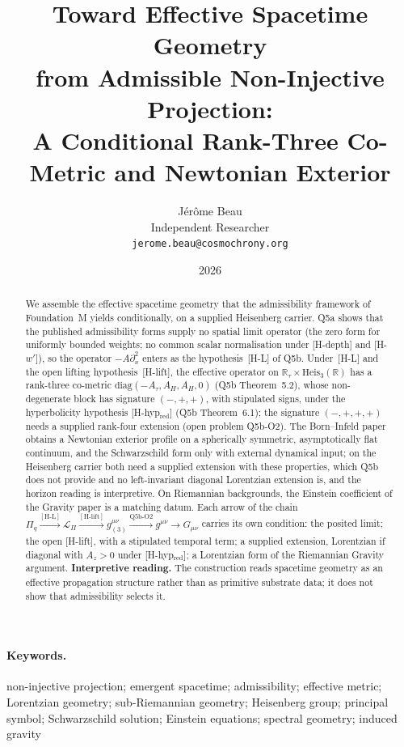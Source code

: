 \documentclass[11pt,a4paper]{article}
\title{Toward Effective Spacetime Geometry\\
from Admissible Non-Injective Projection:\\
A Conditional Rank-Three Co-Metric and Newtonian Exterior}
\author{J\'er\^ome Beau\\
\small Independent Researcher\\
\small \texttt{jerome.beau@cosmochrony.org}}
\date{2026}
\begin{document}
  \maketitle

  \begingroup
  \setlength{\emergencystretch}{2em}
  \begin{abstract}
    We assemble the effective spacetime geometry that the admissibility framework of Foundation~M yields
    conditionally, on a supplied Heisenberg carrier.
    Q5a shows that the published admissibility forms supply no spatial limit operator (the zero form for uniformly
    bounded weights; no common scalar normalisation under [H-depth] and [H-$w'$]), so the operator
    $-A\partial_x^2$ enters as the hypothesis~[H-L] of Q5b.
    Under~[H-L] and the open lifting hypothesis~[H-lift], the effective operator on
    $\mathbb{R}_\tau \times \mathrm{Heis}_3(\mathbb{R})$ has a rank-three co-metric
    $\mathrm{diag}(-A_\tau, A_H, A_H, 0)$ (Q5b Theorem~5.2), whose non-degenerate block has signature $(-,+,+)$, with
    stipulated signs, under the hyperbolicity hypothesis [H-hyp$_{\mathrm{red}}$] (Q5b Theorem~6.1); the signature
    $(-,+,+,+)$ needs a supplied rank-four extension (open problem Q5b-O2).
    The Born–Infeld paper obtains a Newtonian exterior profile on a spherically symmetric, asymptotically flat
    continuum, and the Schwarzschild form only with external dynamical input; on the Heisenberg carrier both need a
    supplied extension with these properties, which Q5b does not provide and no left-invariant diagonal Lorentzian
    extension is, and the horizon reading is interpretive.
    On Riemannian backgrounds, the Einstein coefficient of the Gravity paper is a matching datum.
    Each arrow of the chain $\Pi_q \xrightarrow{[\mathrm{H\text{-}L}]} \mathcal{L}_\Pi
    \xrightarrow{[\mathrm{H\text{-}lift}]} g^{\mu\nu}_{(3)} \xrightarrow{\text{Q5b-O2}} g^{\mu\nu} \to G_{\mu\nu}$
    carries its own condition: the posited limit; the open [H-lift], with a stipulated temporal term; a supplied
    extension, Lorentzian if diagonal with $A_z > 0$ under [H-hyp$_{\mathrm{red}}$]; a Lorentzian form of the
    Riemannian Gravity argument.
    \textbf{Interpretive reading.}
    The construction reads spacetime geometry as an effective propagation structure rather than as primitive
    substrate data; it does not show that admissibility selects it.
  \end{abstract}
  \endgroup

  \paragraph{Keywords.}
    non-injective projection; emergent spacetime; admissibility; effective metric; Lorentzian geometry; sub-Riemannian
    geometry; Heisenberg group; principal symbol; Schwarzschild solution; Einstein equations; spectral geometry; induced
    gravity
\end{document}

